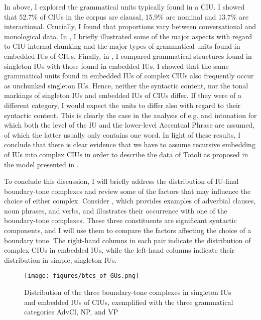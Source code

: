 In   above, I explored the grammatical units typically found in a CIU. I showed that 52.7\% of CIUs in the corpus are clausal, 15.9\% are nominal and 13.7\% are interactional. Crucially, I found that proportions vary   between  conversational and monological data. In  , I briefly illustrated some of the major aspects with regard to CIU-internal chunking and the major types of grammatical units found in embedded IUs of CIUs. Finally, in  , I compared grammatical structures found in singleton IUs with those found in embedded IUs.  I showed that the same grammatical units found in embedded IUs of complex CIUs also frequently occur as unchunked singleton IUs.  Hence, neither the syntactic content, nor the tonal markings of singleton IUs and embedded IUs of CIUs differ. If they were of a different category, I would expect the units to differ also with regard to their syntactic content. This is clearly the case in the analysis of e.g.  and  intonation \citep{Jun_2000, phonology2005and} for which both the level of the IU and the lower-level   Accentual Phrase  are assumed, of which the latter usually only contains one word. In light of these results, I conclude that there is clear evidence that we have to assume recursive embedding of IUs into complex CIUs in order to describe the data of Totoli as proposed in the model presented in  .


To conclude this discussion, I will briefly address the distribution of IU-final boundary-tone complexes and review some of the factors that may influence the choice of either complex. Consider  , which provides examples of adverbial clauses, noun phrases, and verbs, and illustrates their occurrence with one of the boundary-tone complexes. These three constituents are significant syntactic components, and I will use them to compare the factors affecting the choice of a boundary tone. The right-hand columns in each pair indicate the distribution of complex CIUs in embedded IUs, while the left-hand columns indicate their distribution in simple, singleton IUs.

\begin{figure}
	\texttt{[image: figures/btcs\_of\_GUs.png]}
	\caption{Distribution of the three boundary-tone complexes in singleton IUs and embedded IUs of CIUs, exemplified with the three grammatical categories AdvCl, NP, and VP}
	\label{pitch:dis btc}
\end{figure}


